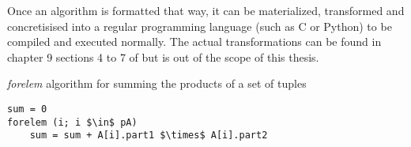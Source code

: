 Once an algorithm is formatted that way, it can be materialized, transformed and concretisised into a regular programming language (such as C or Python) to be compiled and executed normally. The actual transformations can be found in chapter 9 sections 4 to 7 of \cite{Rietveld} but is out of the scope of this thesis.

\begin{algorithm}
\caption{\emph{forelem} algorithm for summing the products of a set of tuples}
\label{algo:forelem-sum}
\begin{lstlisting}[mathescape]
sum = 0
forelem (i; i $\in$ pA)
	sum = sum + A[i].part1 $\times$ A[i].part2
\end{lstlisting}
\end{algorithm}
